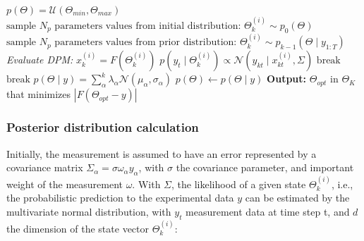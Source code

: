 \begin{algorithm}
\begin{algorithmic}
             $p(\Theta) = \mathcal{U}(\Theta_{min}, \Theta_{max})$
                 $\text{sample $N_{p}$ parameters values from initial  distribution: } \Theta_{k}^{(i)} \sim p_0(\Theta) $
                 $\text{sample $N_{p}$ parameters values from prior distribution: } \Theta_{k}^{(i)} \sim p_{k-1}(\Theta \mid y_{1:T})$
                \EndIf
                \LineComment \textit{Evaluate DPM: }  $x_{k}^{(i)} = F(\Theta_{k}^{(i)}) $ 
                     $p(y_t \mid \Theta_{k}^{(i)} ) \propto \mathcal{N}(y_{kt} \mid x_{kt}^{(i)}, \Sigma)$ 
                     $\text{break}$
                     $\text{break}$
                    \EndIf
                \EndWhile
                $p(\Theta \mid y) = \sum_{\alpha}^{k} \lambda_{\alpha} \mathcal{N}(\mu_{\alpha}, \sigma_{\alpha}) $
                 $p(\Theta) \gets p(\Theta \mid y)$
            \EndFor
        \State \textbf{Output: } $\Theta_{opt}$ in $\Theta_{K}$ that minimizes $|F(\Theta_{opt} - y)|$
    \end{algorithmic}
\end{algorithm}

\subsubsection{Posterior distribution calculation}


Initially, the measurement is assumed to have an error represented by a covariance matrix $\Sigma_{\alpha} = \sigma\omega_{\alpha}y_{\alpha}$, with $\sigma$ the covariance parameter, and important weight of the measurement $\omega$. With $\Sigma$, the likelihood of a given state $\Theta_{k}^{(i)}$, i.e., the probabilistic prediction to the experimental data $y$ can be estimated by the multivariate normal distribution, with $y_t$ measurement data at time step t, and $d$ the dimension of the state vector $\Theta_{k}^{(i)}$:


